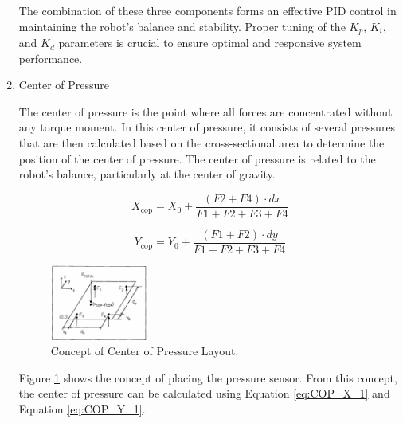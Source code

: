 \begin{enumerate}[label=\Alph*.]
    \hspace*{1em} The combination of these three components forms an effective PID control in maintaining the robot's balance and stability. Proper tuning of the $K_p$, $K_i$, and $K_d$ parameters is crucial to ensure optimal and responsive system performance.

    \item Center of Pressure
    \label{subsec:centerofpressure}

    \hspace*{1em} The center of pressure is the point where all forces are concentrated without any torque moment\cite{hawley2016external}. In this center of pressure, it consists of several pressures that are then calculated based on the cross-sectional area to determine the position of the center of pressure. The center of pressure is related to the robot's balance, particularly at the center of gravity\cite{arifin2017implementasi}.

    \begin{equation}
      X_{\mathrm{cop}} = X_0 + \frac{(F2 + F4) \cdot dx}{F1 + F2 + F3 + F4}
      \label{eq:COP_X_1}
    \end{equation}

    \begin{equation}
      Y_{\mathrm{cop}} = Y_0 + \frac{(F1 + F2) \cdot dy}{F1 + F2 + F3 + F4}
      \label{eq:COP_Y_1}
    \end{equation}

    \begin{figure} [h] \centering
      \includegraphics[width=0.3\textwidth]{gambar/Konsep_Letak.png}
      \caption{Concept of Center of Pressure Layout\cite{resna2005}.}
      \label{fig:Konsep_Letak}
    \end{figure}

    \hspace*{1em} Figure \ref{fig:Konsep_Letak} shows the concept of placing the pressure sensor. From this concept, the center of pressure can be calculated using Equation \ref{eq:COP_X_1} and Equation \ref{eq:COP_Y_1}.
\end{enumerate}
